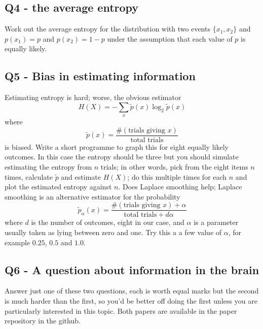 \documentclass[12pt]{article}
\begin{document}
\subsection*{Q4 - the average entropy}

Work out the average entropy for the distribution with two events
$\{x_1,x_2\}$ and $p(x_1)=p$ and $p(x_2)=1-p$ under the assumption
that each value of $p$ is equally likely.


\subsection*{Q5 - Bias in estimating information}

Estimating entropy is hard; worse, the obvious estimator
\begin{equation}
  H(X)=-\sum_x \tilde{p}(x)\log_2\tilde{p}(x)
\end{equation}
where
\begin{equation}
  \tilde{p}(x)=\frac{\#(\mbox{trials giving }x)}{\mbox{total trials}}
\end{equation}
is biased. Write a short programme to graph this for eight equally
likely outcomes. In this case the entropy should be three but you
should simulate estimating the entropy from $n$ trials; in other words, pick from the eight items $n$ times, calculate $\tilde{p}$ and estimate $H(X)$; do this multiple times for each $n$ and plot the estimated entropy against $n$. Does Laplace smoothing help; Laplace smoothing is an alternative estimator for the probability
\begin{equation}
  \tilde{p}_\alpha(x)=\frac{\#(\mbox{trials giving }x)+\alpha}{\mbox{total trials}+d\alpha}
\end{equation}
where $d$ is the number of outcomes, eight in our case, and $\alpha$
is a parameter usually taken as lying between zero and one. Try this a
a few value of $\alpha$, for example $0.25$, $0.5$ and $1.0$.

\subsection*{Q6 - A question about information in the brain}

Answer just one of these two questions, each is worth equal marks but the
second is much harder than the first, so you'd be better off doing the
first unless you are particularly interested in this topic. Both papers are available in the paper repository in the github.
\end{document}
